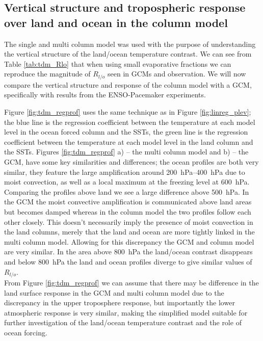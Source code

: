 \subsection{Vertical structure and tropospheric response over land and ocean in 
the column model}

The single and multi column model was used with the purpose of understanding the 
vertical structure of the land/ocean temperature contrast. We can see from Table 
\ref{tab:tdm_Rlo} that when using small evaporative fractions we can reproduce 
the magnitude of $R_{l/o}$ seen in GCMs and observation. We will now compare the 
vertical structure and response of the column model with a GCM, specifically 
with results from the ENSO-Pacemaker experiments.  

Figure \ref{fig:tdm_regprof} uses the same technique as in Figure 
\ref{fig:linreg_plev}; the blue line is the regression coefficient between the 
temperature at each model level in the ocean forced column and the SSTs, the green line 
is the regression coefficient between the temperature at each model level in the 
land column and the SSTs. Figures \ref{fig:tdm_regprof} a) -- the multi column 
model and b) -- the GCM, have some key similarities and differences; the ocean 
profiles are both very similar, they feature the large amplification around 
\SIrange{200}{400}{\hecto\pascal} due to moist convection, as well as a local 
maximum at the freezing level at \SI{600}{\hecto\pascal}.  Comparing the 
profiles above land we see a large difference above \SI{500}{\hecto\pascal}. In 
the GCM the moist convective amplification is communicated above land areas but 
becomes damped whereas in the column model the two profiles follow each other 
closely.  This doesn't necessarily imply the presence of moist convection in the 
land columns, merely that the land and ocean are more tightly linked in the 
multi column model.  Allowing for this discrepancy the GCM and column model are 
very similar.  In the area above \SI{800}{\hecto\pascal} the land/ocean contrast 
disappears and below \SI{800}{\hecto\pascal} the land and ocean profiles diverge 
to give similar values of $R_{l/o}$.\\
From Figure \ref{fig:tdm_regprof} we can assume that there may be difference in 
the land surface response in the GCM and multi column model due to the 
discrepancy in the upper troposphere response, but importantly the lower 
atmospheric response is very similar, making the simplified model suitable for 
further investigation of the land/ocean temperature contrast and the role of 
ocean forcing.


